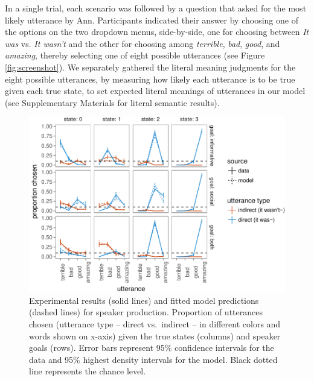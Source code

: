 \documentclass[12pt]{article}
\begin{document}
In a single trial, each scenario was followed by a question that asked for the most likely utterance by Ann. 
Participants indicated their answer by choosing one of the options on the two dropdown menus, 
side-by-side, one for choosing between \emph{It was} vs. \emph{It wasn't} and the other for choosing among \emph{terrible}, \emph{bad}, \emph{good}, and \emph{amazing}, 
thereby selecting one of eight possible utterances (see Figure \ref{fig:screenshot}). 
We separately gathered the literal meaning judgments for the eight possible utterances, 
by measuring how likely each utterance is to be true given each true state, to set expected
literal meanings of utterances in our model 
(see Supplementary Materials for literal semantic results).

\begin{figure}
\centering
\includegraphics{politeness_files/figure-latex/utterancePrediction-1.pdf}
\caption{\label{fig:utterancePrediction}Experimental results (solid lines) and fitted model predictions (dashed lines) for speaker production.
Proportion of utterances chosen (utterance type -- direct vs.~indirect -- in different colors and words shown on x-axis) given the true states (columns) and speaker goals (rows). Error bars represent 95\% confidence intervals for the data and 95\% highest density intervals for the model.
Black dotted line represents the chance level.}
\end{figure}
\end{document}
